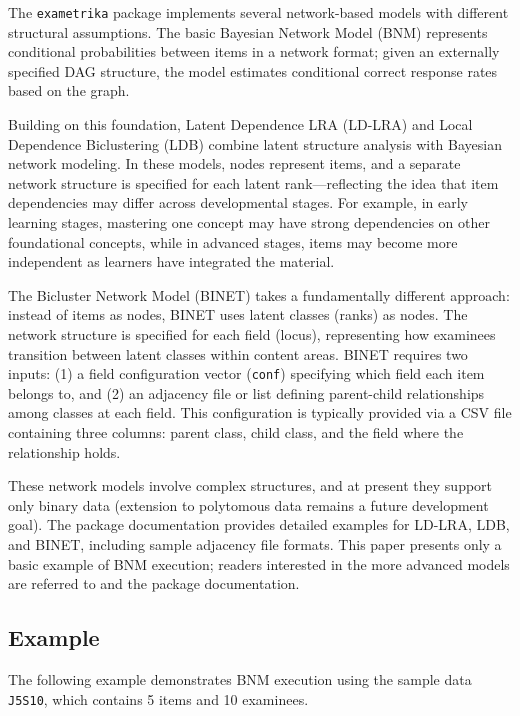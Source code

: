 The \texttt{exametrika} package implements several network-based models with different structural assumptions. The basic Bayesian Network Model (BNM) represents conditional probabilities between items in a network format; given an externally specified DAG structure, the model estimates conditional correct response rates based on the graph.

Building on this foundation, Latent Dependence LRA (LD-LRA) and Local Dependence Biclustering (LDB) combine latent structure analysis with Bayesian network modeling. In these models, nodes represent items, and a separate network structure is specified for each latent rank---reflecting the idea that item dependencies may differ across developmental stages. For example, in early learning stages, mastering one concept may have strong dependencies on other foundational concepts, while in advanced stages, items may become more independent as learners have integrated the material.

The Bicluster Network Model (BINET) takes a fundamentally different approach: instead of items as nodes, BINET uses latent classes (ranks) as nodes. The network structure is specified for each field (locus), representing how examinees transition between latent classes within content areas. BINET requires two inputs: (1) a field configuration vector (\texttt{conf}) specifying which field each item belongs to, and (2) an adjacency file or list defining parent-child relationships among classes at each field. This configuration is typically provided via a CSV file containing three columns: parent class, child class, and the field where the relationship holds.

These network models involve complex structures, and at present they support only binary data (extension to polytomous data remains a future development goal). The package documentation \citep{kosugitti} provides detailed examples for LD-LRA, LDB, and BINET, including sample adjacency file formats. This paper presents only a basic example of BNM execution; readers interested in the more advanced models are referred to \citet{shojima} and the package documentation.

\subsection{Example}\label{example-2}

The following example demonstrates BNM execution using the sample data \texttt{J5S10}, which contains 5 items and 10 examinees.

